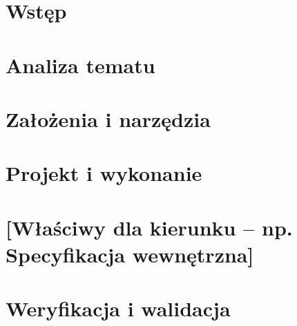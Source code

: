 \documentclass[a4paper,twoside,12pt]{book}
\begin{document}
\tableofcontents

\setcounter{stronyPozaNumeracja}{\value{page}}
\mainmatter
\pagestyle{empty}

\cleardoublepage

\pagestyle{NumeryStronNazwyRozdzialow}


\chapter{Wstęp}


\chapter{Analiza tematu}


\chapter{Założenia i narzędzia}


\chapter{Projekt i wykonanie}



\chapter{[Właściwy dla kierunku -- np. Specyfikacja wewnętrzna]}


\chapter{Weryfikacja i walidacja}

\end{document}
